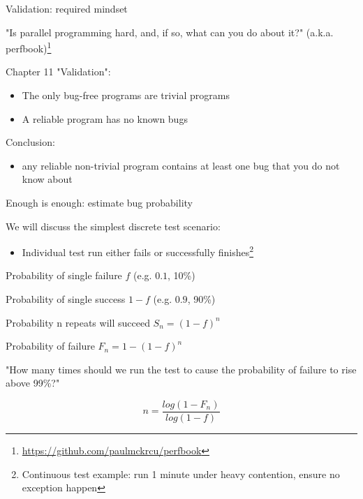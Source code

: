 \begin{frame}[t]{Validation: required mindset}

"Is parallel programming hard, and, if so, what can you do about it?" (a.k.a. perfbook)\footnote{\tiny\url{https://github.com/paulmckrcu/perfbook}}

Chapter 11 "Validation":

\pause

\begin{itemize}
         \item The only bug-free programs are trivial programs
  \pause \item A reliable program has no known bugs
\end{itemize}

\pause
Conclusion: 
\begin{itemize}
    \pause \item any reliable non-trivial program contains at least one bug that you do not know about
\end{itemize}
\end{frame}



\begin{frame}{Enough is enough: estimate bug probability}

We will discuss the simplest discrete test scenario:
\begin{itemize}
  \item Individual test run either fails or successfully finishes\footnote{Continuous test example: run 1 minute under heavy contention, ensure no exception happen}
\end{itemize}

\pause
Probability of single failure $f$ (e.g. $0.1$, 10\%)

\pause
Probability of single success  $1 - f$ (e.g. $0.9$, 90\%)

\pause
Probability n repeats will succeed $S_n=(1-f)^n$

\pause
Probability of failure $F_n=1-(1-f)^n$

\pause
"How many times should we run the test to cause the probability of failure to rise above 99\%?" \pause

$$n=\frac{log(1-F_n)}{log(1-f)}$$


\end{frame}


